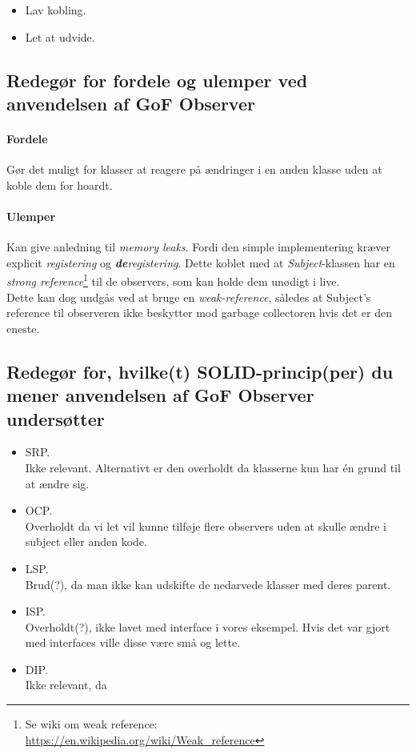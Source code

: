 \begin{itemize}
	\item Lav kobling.
	\item Let at udvide.
\end{itemize}

\subsection{Redegør for fordele og ulemper ved anvendelsen af GoF Observer}

\paragraph{Fordele}
Gør det muligt for klasser at reagere på ændringer i en anden klasse uden at koble dem for hoardt.

\paragraph{Ulemper}
Kan give anledning til \textit{memory leaks}. Fordi den simple implementering kræver explicit \textit{registering} og \textit{\textbf{de}registering}. Dette koblet med at \textit{Subject}-klassen har en \textit{strong reference}\footnote{Se wiki om weak reference:\\ \url{https://en.wikipedia.org/wiki/Weak_reference}} til de observers, som kan holde dem unødigt i live.\\
Dette kan dog undgås ved at bruge en \textit{weak-reference}, således at Subject's reference til observeren ikke beskytter mod garbage collectoren hvis det er den eneste.

\subsection{Redegør for, hvilke(t) SOLID-princip(per) du mener anvendelsen af GoF Observer undersøtter}

\begin{itemize}
	\item SRP.\\
	Ikke relevant. Alternativt er den overholdt da klasserne kun har én grund til at ændre sig.
	\item OCP.\\
	Overholdt da vi let vil kunne tilføje flere observers uden at skulle ændre i subject eller anden kode.
	\item LSP.\\
	Brud(?), da man ikke kan udskifte de nedarvede klasser med deres parent.
	\item ISP.\\
	Overholdt(?), ikke lavet med interface i vores eksempel. Hvis det var gjort med interfaces ville disse være små og lette. 
	\item DIP.\\
	Ikke relevant, da 
\end{itemize}